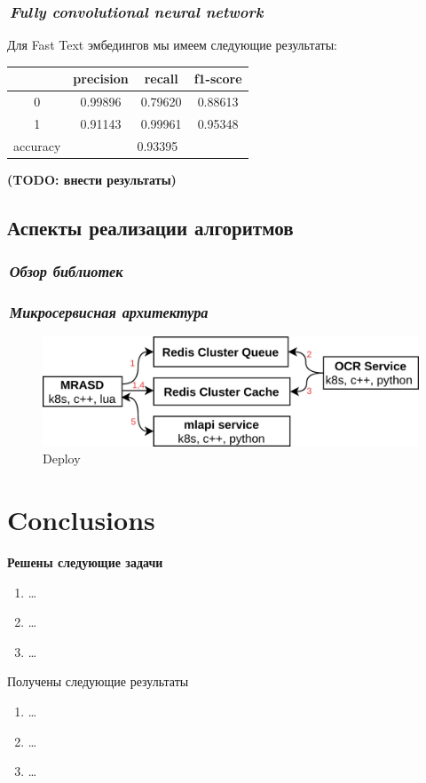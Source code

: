 \documentclass[12pt]{article}
\begin{document}
\subsubsection*{\it\,Fully convolutional neural network}
Для Fast Text эмбедингов мы имеем следующие результаты:
\begin{center}
  \begin{tabular}{ | c | c | c | c |}
    \hline
      & precision & recall & f1-score \\ \hline
    0 & 0.99896 & 0.79620 & 0.88613 \\ \hline
    1 & 0.91143 & 0.99961 & 0.95348 \\ \hline
    accuracy & \multicolumn{3}{c|}{0.93395} \\                   
    \hline
  \end{tabular}
\end{center}
{\bf\color{amaranth} (TODO: внести результаты)}

\subsection{Аспекты реализации алгоритмов}

\subsubsection*{\it\,Обзор библиотек}

\subsubsection*{\it\,Микросервисная архитектура}
\begin{figure}[h!]
	\center
	\includegraphics[scale=0.25]{deploy.jpg}
	\caption{Deploy}
	\label{fig:02}
\end{figure}

\section{Conclusions}
{
\bf\color{amaranth}
Решены следующие задачи
\begin{enumerate}
	\item \ldots
	\item \ldots
	\item \ldots
\end{enumerate}

Получены следующие результаты
\begin{enumerate}
\item \ldots
\item \ldots
\item \ldots
\end{enumerate}
}
\end{document}

